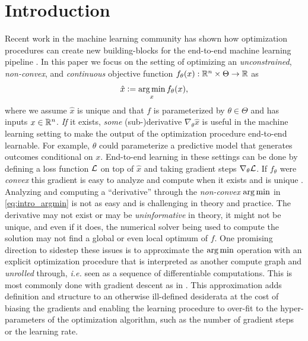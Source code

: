 \documentclass{article}
\newcommand{\ie}{{\it i.e.}\xspace}
\begin{document}
\section{Introduction}
Recent work in the machine learning community has shown how
optimization procedures can create new building-blocks
for the end-to-end machine learning pipeline
\citep{gould2016differentiating,johnson2016composing,amos2017input,amos2017optnet,domke2012generic,metz2016unrolled,finn2017model,zhang2019deep,belanger2017end,rusu2018meta,srinivas2018universal,amos2018differentiable,agrawal2019differentiable}.
In this paper we focus on the setting of optimizing
an \emph{unconstrained}, \emph{non-convex}, and \emph{continuous}
objective function
$f_\theta(x):{\mathbb{R}}^n \times\Theta\rightarrow {\mathbb{R}}$
as
\begin{equation}
\hat x \vcentcolon= \operatorname*{arg\,min}_x f_\theta(x),
\label{eq:intro_argmin}
\end{equation}
where we assume $\hat x$ is unique and that
$f$ is parameterized by $\theta\in\Theta$
and has inputs $x\in{\mathbb{R}}^n$.
\emph{If} it exists, \emph{some} \mbox{(sub-)derivative}
$\nabla_\theta \hat x$
is useful in the machine learning setting to make
the output of the optimization procedure end-to-end learnable.
For example, $\theta$ could parameterize a predictive model
that generates outcomes conditional on $x$.
End-to-end learning in these settings can be done by
defining a loss function $\mathcal{L}$ on top of $\hat x$
and taking gradient steps
$\nabla_\theta \mathcal{L}$.
If $f_\theta$ were \emph{convex} this gradient is easy to analyze
and compute when it exists and is unique
\citep{gould2016differentiating,johnson2016composing,amos2017input,amos2017optnet}.
Analyzing and computing a ``derivative'' through the
\emph{non-convex} $\operatorname*{arg\,min}$ in
\cref{eq:intro_argmin}
is not as easy and is challenging in theory and practice.
The derivative may not exist or may be \emph{uninformative} in theory,
it might not be unique, and even if it does, the numerical solver being used
to compute the solution may not find a global or even local optimum of $f$.
One promising direction to sidestep these issues is to approximate
the $\operatorname*{arg\,min}$ operation with an explicit optimization procedure
that is interpreted as another compute graph and \emph{unrolled} through,
\ie seen as a sequence of differentiable computations.
This is most commonly done with gradient descent as in
\citet{domke2012generic,metz2016unrolled,finn2017model,belanger2017end,rusu2018meta,srinivas2018universal,foerster2018learning,zhang2019deep}.
This approximation adds definition and structure to an
otherwise ill-defined desiderata at the cost of
biasing the gradients and enabling the learning procedure to
over-fit to the hyper-parameters of the optimization algorithm,
such as the number of gradient steps or the learning rate.
\end{document}
